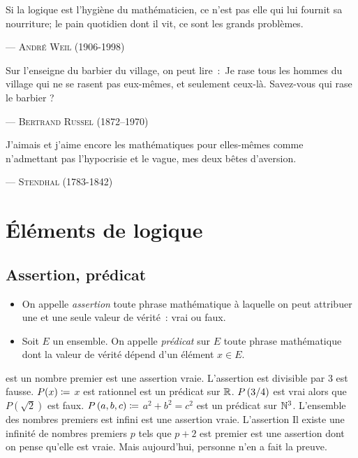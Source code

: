\documentclass{magnolia}
\begin{document}
\setlength{}
\epigraph{\og Si la logique est l'hygiène du mathématicien, ce n'est pas elle qui lui fournit sa
  nourriture; le pain quotidien dont il vit, ce sont les grands problèmes.\fg}{--- \textsc{André Weil (1906-1998)}}
\setlength{}
\epigraph{\og  Sur l’enseigne du barbier du village, on peut lire~:~Je rase tous les hommes du
  village qui ne se rasent pas eux-mêmes, et seulement ceux-là. Savez-vous qui rase
  le barbier ? \fg}{--- \textsc{Bertrand Russel (1872--1970)}}
\setlength{}
\epigraph{\og J'aimais et j'aime encore les mathématiques pour elles-mêmes comme n'admettant
  pas l'hypocrisie et le vague, mes deux bêtes d'aversion.\fg}{--- \textsc{Stendhal (1783-1842)}}

\magtoc

\section{Éléments de logique}

\subsection{Assertion, prédicat}

\begin{definition}[utile=-3]
\begin{itemize}
\item On appelle \emph{assertion} toute phrase mathématique à laquelle
  on peut attribuer une et une seule valeur de vérité~: vrai ou faux.
\item Soit $E$ un ensemble. On appelle \emph{prédicat} sur $E$ toute phrase mathématique
  dont la valeur de vérité dépend d'un élément $x\in E$.
\end{itemize}
\end{definition}

\begin{exemples}
\exemple {} est un nombre premier \fg est une assertion vraie.
  L'assertion  est divisible par 3 \fg est fausse.
\exemple $P(x)\coloneqq$ \og $x$ est rationnel \fg est un prédicat sur $\mathbb{R}$. $P\left(3/4\right)$
  est vrai alors que $P(\sqrt{2})$ est faux.
\exemple $P\left(a,b,c\right)\coloneqq$ \og $a^2+b^2=c^2$ \fg est un prédicat sur $\mathbb{N}^3$.
\exemple \og L'ensemble des nombres premiers est infini \fg est une assertion
  vraie. L'assertion \og Il existe une infinité de nombres premiers $p$ tels
  que $p+2$ est premier \fg est une assertion dont on pense qu'elle est vraie. Mais aujourd'hui, personne n'en a fait la preuve.
\end{exemples}
\end{document}
